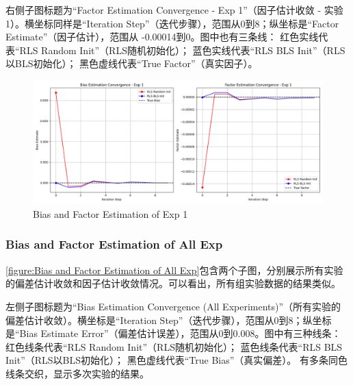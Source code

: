 \documentclass[openany,12pt,UTF8]{ctexart}
\begin{document}
右侧子图标题为“Factor Estimation Convergence - Exp 1”（因子估计收敛 - 实验1）。横坐标同样是“Iteration Step”（迭代步骤），范围从0到8；纵坐标是“Factor Estimate”（因子估计），范围从 -0.00014到0。图中也有三条线：
红色实线代表“RLS Random Init”（RLS随机初始化）；
蓝色实线代表“RLS BLS Init”（RLS以BLS初始化）；
黑色虚线代表“True Factor”（真实因子）。 
\begin{figure}[h]\centering
    \includegraphics[width=\columnwidth]{figures/Bias and Factor Estimation of Exp 1.png}
    \caption{Bias and Factor Estimation of Exp 1}
    \label{figure:Bias and Factor Estimation of Exp 1}
\end{figure}

\subsubsection{Bias and Factor Estimation of All Exp}
\autoref{figure:Bias and Factor Estimation of All Exp}包含两个子图，分别展示所有实验的偏差估计收敛和因子估计收敛情况。可以看出，所有组实验数据的结果类似。

左侧子图标题为“Bias Estimation Convergence (All Experiments)”（所有实验的偏差估计收敛）。横坐标是“Iteration Step”（迭代步骤），范围从0到8；纵坐标是“Bias Estimate Error”（偏差估计误差），范围从0到0.008。图中有三种线条：
 红色线条代表“RLS Random Init”（RLS随机初始化）；
 蓝色线条代表“RLS BLS Init”（RLS以BLS初始化）；
 黑色虚线代表“True Bias”（真实偏差）。
有多条同色线条交织，显示多次实验的结果。
\end{document}
